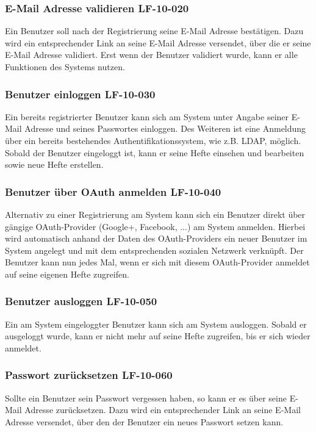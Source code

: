 \documentclass[12pt,a4paper,oneside,ngerman]{scrartcl}
\begin{document}
\subsubsection{E-Mail Adresse validieren \hfill LF-10-020}
Ein Benutzer soll nach der Registrierung seine E-Mail Adresse bestätigen. Dazu wird ein entsprechender Link an seine E-Mail Adresse versendet, über die er seine E-Mail Adresse validiert. Erst wenn der Benutzer validiert wurde, kann er alle Funktionen des Systems nutzen.

\subsubsection{Benutzer einloggen \hfill LF-10-030}
Ein bereits registrierter Benutzer kann sich am System unter Angabe seiner E-Mail Adresse und seines Passwortes einloggen. Des Weiteren ist eine Anmeldung über ein bereits bestehendes Authentifikationssystem, wie z.B. LDAP, möglich.
Sobald der Benutzer eingeloggt ist, kann er seine Hefte einsehen und bearbeiten sowie neue Hefte erstellen.

\subsubsection{Benutzer über OAuth anmelden \hfill LF-10-040}
Alternativ zu einer Registrierung am System kann sich ein Benutzer direkt über gängige OAuth-Provider (Google+, Facebook, ...) am System anmelden. Hierbei wird automatisch anhand der Daten des OAuth-Providers ein neuer Benutzer im System angelegt und mit dem entsprechenden sozialen Netzwerk verknüpft. Der Benutzer kann nun jedes Mal, wenn er sich mit diesem OAuth-Provider anmeldet auf seine eigenen Hefte zugreifen.

\subsubsection{Benutzer ausloggen \hfill LF-10-050}
Ein am System eingeloggter Benutzer kann sich am System ausloggen. Sobald er ausgeloggt wurde, kann er nicht mehr auf seine Hefte zugreifen, bis er sich wieder anmeldet.

\subsubsection{Passwort zurücksetzen \hfill LF-10-060}
Sollte ein Benutzer sein Passwort vergessen haben, so kann er es über seine E-Mail Adresse zurücksetzen. Dazu wird ein entsprechender Link an seine E-Mail Adresse versendet, über den der Benutzer ein neues Passwort setzen kann.
\end{document}

